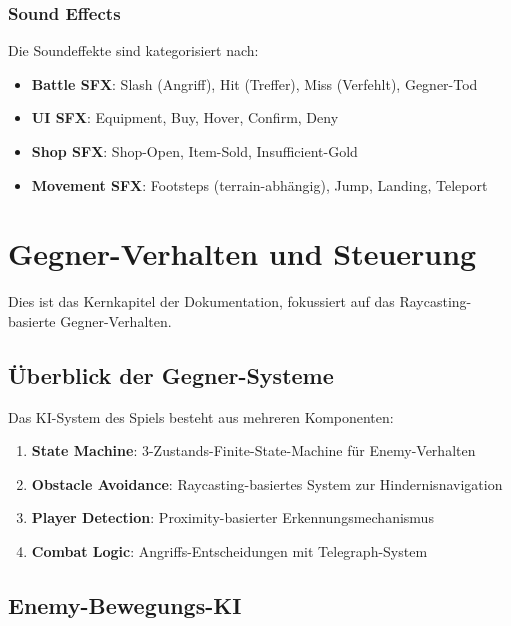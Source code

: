 \documentclass[
  a4paper,
  11pt,
  ngerman,
  parskip=half,
  bibliography=totoc,
  listof=totoc
]{scrreprt}
\begin{document}
\subsection{Sound Effects}

Die Soundeffekte sind kategorisiert nach:

\begin{itemize}
    \item \textbf{Battle SFX}: Slash (Angriff), Hit (Treffer), Miss (Verfehlt), Gegner-Tod
    \item \textbf{UI SFX}: Equipment, Buy, Hover, Confirm, Deny
    \item \textbf{Shop SFX}: Shop-Open, Item-Sold, Insufficient-Gold
    \item \textbf{Movement SFX}: Footsteps (terrain-abhängig), Jump, Landing, Teleport
\end{itemize}


\chapter{Gegner-Verhalten und Steuerung}

Dies ist das Kernkapitel der Dokumentation, fokussiert auf das Raycasting-basierte Gegner-Verhalten.

\section{Überblick der Gegner-Systeme}

Das KI-System des Spiels besteht aus mehreren Komponenten:

\begin{enumerate}
    \item \textbf{State Machine}: 3-Zustands-Finite-State-Machine für Enemy-Verhalten
    \item \textbf{Obstacle Avoidance}: Raycasting-basiertes System zur Hindernisnavigation
    \item \textbf{Player Detection}: Proximity-basierter Erkennungsmechanismus
    \item \textbf{Combat Logic}: Angriffs-Entscheidungen mit Telegraph-System
\end{enumerate}

\section{Enemy-Bewegungs-KI}
\end{document}
